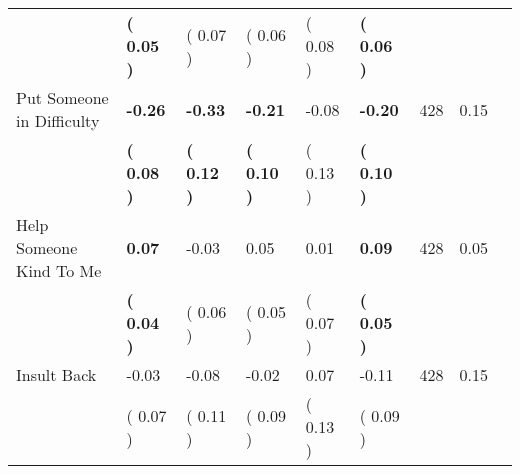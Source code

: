 \begin{tabular}{L{6.2cm} C{1.8cm} C{1.8cm} C{1.8cm} C{1.8cm} C{1.8cm} C{1.8cm} C{0.3cm} C{0.3cm}}
 & \textbf{(     0.05 )} & (     0.07 ) & (     0.06 ) & (     0.08 ) & \textbf{(     0.06 )}  & \\
Put Someone in Difficulty & \textbf{    -0.26} & \textbf{    -0.33} & \textbf{    -0.21} &     -0.08 & \textbf{    -0.20}  & 428 &       0.15 \\ 
 & \textbf{(     0.08 )} & \textbf{(     0.12 )} & \textbf{(     0.10 )} & (     0.13 ) & \textbf{(     0.10 )}  & \\
Help Someone Kind To Me & \textbf{     0.07} &     -0.03 &      0.05 &      0.01 & \textbf{     0.09}  & 428 &       0.05 \\ 
 & \textbf{(     0.04 )} & (     0.06 ) & (     0.05 ) & (     0.07 ) & \textbf{(     0.05 )}  & \\
Insult Back &     -0.03 &     -0.08 &     -0.02 &      0.07 &     -0.11  & 428 &       0.15 \\ 
 & (     0.07 ) & (     0.11 ) & (     0.09 ) & (     0.13 ) & (     0.09 )  & \\
\bottomrule
\end{tabular}
